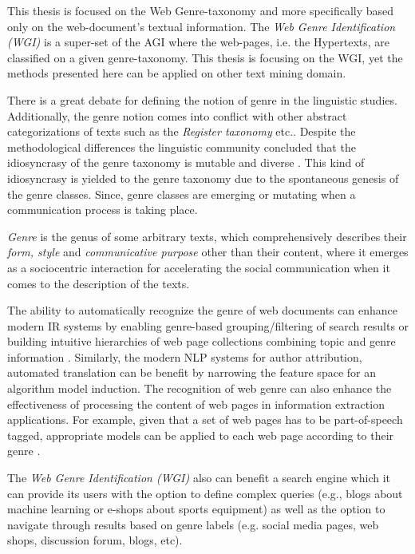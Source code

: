 This thesis is focused on the Web Genre-taxonomy and more specifically based only on the web-document's textual information. The \textit{Web Genre Identification (WGI)} is a super-set of the AGI where the web-pages, i.e. the Hypertexts, are classified on a given genre-taxonomy. This thesis is focusing on the WGI, yet the methods presented here can be applied on other text mining domain.

There is a great debate for defining the notion of genre in the linguistic studies. Additionally, the genre notion comes into conflict with other abstract categorizations of texts such as the \textit{Register taxonomy} etc.. Despite the methodological differences the linguistic community concluded that the idiosyncrasy of the genre taxonomy is mutable and diverse \cite{coutinho2009describe}. This kind of idiosyncrasy is yielded to the genre taxonomy due to the spontaneous genesis of the genre classes. Since, genre classes are emerging or mutating when a communication process is taking place.

\theoremstyle{definition}
\begin{definition}{\textit{Genre}}
is the genus of some arbitrary texts, which comprehensively describes their \textit{form, style} and \textit{communicative purpose} other than their content, where it emerges as a sociocentric interaction for accelerating the social communication when it comes to the description of the texts.
\end{definition}

The ability to automatically recognize the genre of web documents can enhance modern IR systems by enabling genre-based grouping/filtering of search results or building intuitive hierarchies of web page collections combining topic and genre information \parencite{Braslavski2007,Rosso2008,de2009genre}. Similarly, the modern NLP systems for author attribution, automated translation can be benefit by narrowing the feature space for an algorithm model induction. The recognition of web genre can also enhance the effectiveness of processing the content of web pages in information extraction applications. For example, given that a set of web pages has to be part-of-speech tagged, appropriate models can be applied to each web page according to their genre \parencite{Nooralahzadeh2014}.

The \textit{Web Genre Identification  (WGI)} also can benefit a search engine which it can provide its users with the option to define complex queries (e.g., blogs about machine learning or e-shops about sports equipment) as well as the option to navigate through results based on genre labels (e.g. social media pages, web shops, discussion forum, blogs, etc).

